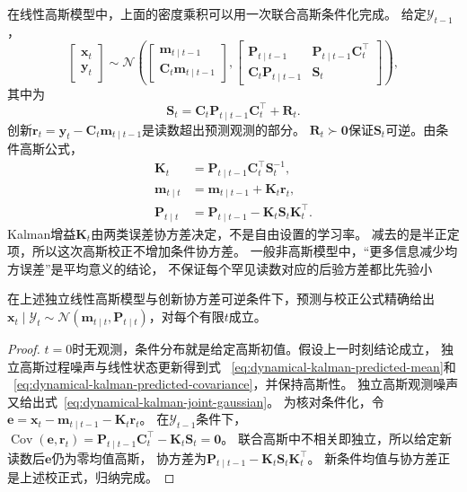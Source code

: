 在线性高斯模型中，上面的密度乘积可以用一次联合高斯条件化完成。
给定$\mathcal Y_{t-1}$，
\begin{equation}
 \begin{bmatrix}\bm x_t\\\bm y_t\end{bmatrix}
 \sim\mathcal N\left(
 \begin{bmatrix}\bm m_{t\mid t-1}\\\bm C_t\bm m_{t\mid t-1}\end{bmatrix},
 \begin{bmatrix}
  \bm P_{t\mid t-1}&\bm P_{t\mid t-1}\bm C_t^\top\\
  \bm C_t\bm P_{t\mid t-1}&\bm S_t
 \end{bmatrix}\right),
 \label{eq:dynamical-kalman-joint-gaussian}
\end{equation}
其中为
\begin{equation}
 \bm S_t=\bm C_t\bm P_{t\mid t-1}\bm C_t^\top+\bm R_t.
 \label{eq:dynamical-kalman-innovation-covariance}
\end{equation}
创新$\bm r_t=\bm y_t-\bm C_t\bm m_{t\mid t-1}$是读数超出预测观测的部分。
$\bm R_t\succ\bm0$保证$\bm S_t$可逆。由条件高斯公式，
\begin{align}
 \bm K_t&=\bm P_{t\mid t-1}\bm C_t^\top\bm S_t^{-1},
       \label{eq:dynamical-kalman-gain}\\
 \bm m_{t\mid t}&=\bm m_{t\mid t-1}+\bm K_t\bm r_t,
       \label{eq:dynamical-kalman-filtered-mean}\\
 \bm P_{t\mid t}&=\bm P_{t\mid t-1}-\bm K_t\bm S_t\bm K_t^\top.
       \label{eq:dynamical-kalman-filtered-covariance}
\end{align}
Kalman增益$\bm K_t$由两类误差协方差决定，不是自由设置的学习率。
减去的是半正定项，所以这次高斯校正不增加条件协方差。
一般非高斯模型中，“更多信息减少均方误差”是平均意义的结论，
不保证每个罕见读数对应的后验方差都比先验小

\begin{theorem}[有限时域Kalman滤波]
 \label{thm:dynamical-finite-horizon-kalman-filter}
 在上述独立线性高斯模型与创新协方差可逆条件下，预测与校正公式精确给出
 $\bm x_t\mid\mathcal Y_t\sim
       \mathcal N(\bm m_{t\mid t},\bm P_{t\mid t})$，对每个有限$t$成立。
\end{theorem}
\begin{proof}
 $t=0$时无观测，条件分布就是给定高斯初值。假设上一时刻结论成立，
 独立高斯过程噪声与线性状态更新得到式
 ~\eqref{eq:dynamical-kalman-predicted-mean}和
 ~\eqref{eq:dynamical-kalman-predicted-covariance}，并保持高斯性。
 独立高斯观测噪声又给出式~\eqref{eq:dynamical-kalman-joint-gaussian}。
 为核对条件化，令$\bm e=\bm x_t-\bm m_{t\mid t-1}-\bm K_t\bm r_t$。
 在$\mathcal Y_{t-1}$条件下，
 $\operatorname{Cov}(\bm e,\bm r_t)
   =\bm P_{t\mid t-1}\bm C_t^\top-\bm K_t\bm S_t=\bm0$。
 联合高斯中不相关即独立，所以给定新读数后$\bm e$仍为零均值高斯，
 协方差为$\bm P_{t\mid t-1}-\bm K_t\bm S_t\bm K_t^\top$。
 新条件均值与协方差正是上述校正式，归纳完成。
\end{proof}

